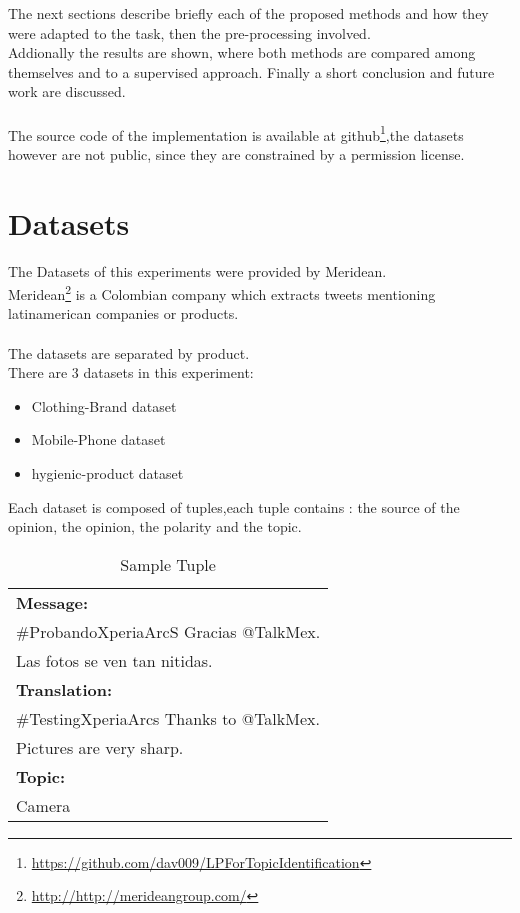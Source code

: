 \documentclass[4pt,a4paper,twocolumn]{article}
\begin{document}
The next sections describe briefly each of the proposed methods and how they were adapted to the task, then the pre-processing involved. \\
Addionally the results are shown, where both methods are compared among themselves and to a supervised approach.
Finally a short conclusion and future work are discussed.\\
\\
The source code of the implementation is available at github\footnote{\url{https://github.com/dav009/LPForTopicIdentification}},the datasets however are not public, since they are constrained by a permission license.

\part*{Datasets}
The Datasets of this experiments were provided by Meridean.\\
Meridean\footnote{\url{http://http://merideangroup.com/}} is a Colombian company which extracts tweets
mentioning latinamerican companies or products.\\
\\
The datasets are separated by product.\\
There are 3 datasets in this experiment:
\begin{itemize}
	\item Clothing-Brand dataset
	\item Mobile-Phone dataset
	\item hygienic-product dataset
\end{itemize}

Each dataset is composed of tuples,each tuple contains : the source of the opinion, the opinion, the polarity and the topic.\\

\begin{table}[h]
\centering
\begin{tabular}{| l |}
\hline
\textbf{Message:}\\
$\#$ProbandoXperiaArcS Gracias @TalkMex.\\
Las fotos se ven tan nitidas.\\
\hline
\textbf{Translation:}\\
$\#$TestingXperiaArcs Thanks to @TalkMex.\\
Pictures are very sharp.\\
\hline
\textbf{Topic:}\\
Camera\\
\hline
\end{tabular}
\caption{Sample Tuple}
\label{tab:sampleTuple}
\end{table}
\end{document}
